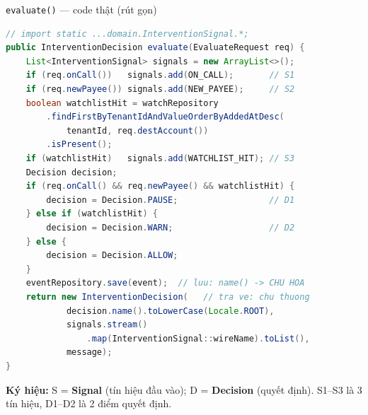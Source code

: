 \documentclass[aspectratio=169,12pt]{beamer}
\begin{document}
\begin{frame}[fragile,shrink=18]{\texttt{evaluate()} --- code thật (rút gọn)}
\begin{lstlisting}[language=java]
// import static ...domain.InterventionSignal.*;
public InterventionDecision evaluate(EvaluateRequest req) {
    List<InterventionSignal> signals = new ArrayList<>();
    if (req.onCall())   signals.add(ON_CALL);       // S1
    if (req.newPayee()) signals.add(NEW_PAYEE);     // S2
    boolean watchlistHit = watchRepository
        .findFirstByTenantIdAndValueOrderByAddedAtDesc(
            tenantId, req.destAccount())
        .isPresent();
    if (watchlistHit)   signals.add(WATCHLIST_HIT); // S3
    Decision decision;
    if (req.onCall() && req.newPayee() && watchlistHit) {
        decision = Decision.PAUSE;                  // D1
    } else if (watchlistHit) {
        decision = Decision.WARN;                   // D2
    } else {
        decision = Decision.ALLOW;
    }
    eventRepository.save(event);  // luu: name() -> CHU HOA
    return new InterventionDecision(   // tra ve: chu thuong
            decision.name().toLowerCase(Locale.ROOT),
            signals.stream()
                .map(InterventionSignal::wireName).toList(),
            message);
}
\end{lstlisting}
{\scriptsize \textbf{Ký hiệu:}
S = \textbf{Signal} (tín hiệu đầu vào); D = \textbf{Decision} (quyết định).
S1--S3 là 3 tín hiệu, D1--D2 là 2 điểm quyết định.}
\end{frame}
\end{document}

